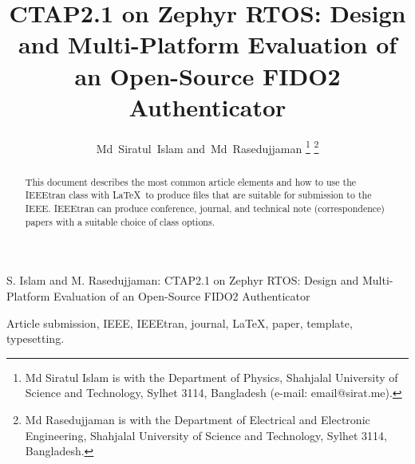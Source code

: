 \documentclass[lettersize,journal]{IEEEtran}
\begin{document}
\title{CTAP2.1 on Zephyr RTOS: Design and Multi-Platform Evaluation of an Open-Source FIDO2 Authenticator}

\author{
    Md~Siratul~Islam
    and~Md~Rasedujjaman
    \thanks{Md Siratul Islam is with the Department of Physics, Shahjalal University of Science and Technology, Sylhet 3114, Bangladesh (e-mail: email@sirat.me).}
    \thanks{Md Rasedujjaman is with the Department of Electrical and Electronic Engineering, Shahjalal University of Science and Technology, Sylhet 3114, Bangladesh.}
}

%
{S. Islam and M. Rasedujjaman: CTAP2.1 on Zephyr RTOS: Design and Multi-Platform Evaluation of an Open-Source FIDO2 Authenticator}


\maketitle

\begin{abstract}
This document describes the most common article elements and how to use the IEEEtran class with \LaTeX \ to produce files that are suitable for submission to the IEEE.  IEEEtran can produce conference, journal, and technical note (correspondence) papers with a suitable choice of class options.
\end{abstract}

\begin{IEEEkeywords}
Article submission, IEEE, IEEEtran, journal, \LaTeX, paper, template, typesetting.
\end{IEEEkeywords}


\newpage







\newpage


\vfill
\end{document}
